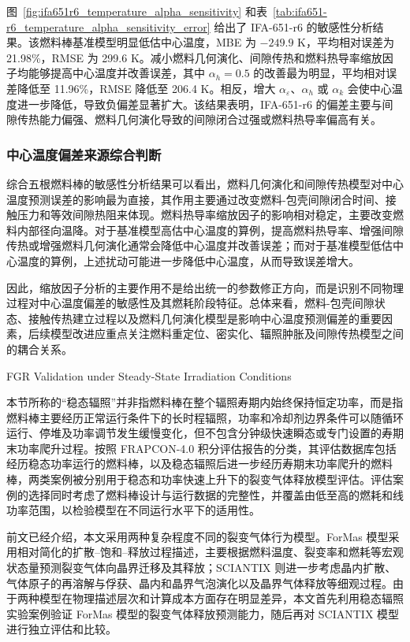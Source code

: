 图~\ref{fig:ifa651r6_temperature_alpha_sensitivity} 和表~\ref{tab:ifa651-r6_temperature_alpha_sensitivity_error} 给出了 IFA-651-r6 的敏感性分析结果。该燃料棒基准模型明显低估中心温度，MBE 为 \(-249.9\) K，平均相对误差为 21.98\%，RMSE 为 299.6 K。减小燃料几何演化、间隙传热和燃料热导率缩放因子均能够提高中心温度并改善误差，其中 \(\alpha_h=0.5\) 的改善最为明显，平均相对误差降低至 11.96\%，RMSE 降低至 206.4 K。相反，增大 \(\alpha_{\varepsilon}\)、\(\alpha_h\) 或 \(\alpha_k\) 会使中心温度进一步降低，导致负偏差显著扩大。该结果表明，IFA-651-r6 的偏差主要与间隙传热能力偏强、燃料几何演化导致的间隙闭合过强或燃料热导率偏高有关。

\subsubsection{中心温度偏差来源综合判断}

综合五根燃料棒的敏感性分析结果可以看出，燃料几何演化和间隙传热模型对中心温度预测误差的影响最为直接，其作用主要通过改变燃料-包壳间隙闭合时间、接触压力和等效间隙热阻来体现。燃料热导率缩放因子的影响相对稳定，主要改变燃料内部径向温降。对于基准模型高估中心温度的算例，提高燃料热导率、增强间隙传热或增强燃料几何演化通常会降低中心温度并改善误差；而对于基准模型低估中心温度的算例，上述扰动可能进一步降低中心温度，从而导致误差增大。

因此，缩放因子分析的主要作用不是给出统一的参数修正方向，而是识别不同物理过程对中心温度偏差的敏感性及其燃耗阶段特征。总体来看，燃料-包壳间隙状态、接触传热建立过程以及燃料几何演化模型是影响中心温度预测偏差的重要因素，后续模型改进应重点关注燃料重定位、密实化、辐照肿胀及间隙传热模型之间的耦合关系。


{FGR Validation under Steady-State Irradiation Conditions}

本节所称的“稳态辐照”并非指燃料棒在整个辐照寿期内始终保持恒定功率，而是指燃料棒主要经历正常运行条件下的长时程辐照，功率和冷却剂边界条件可以随循环运行、停堆及功率调节发生缓慢变化，但不包含分钟级快速瞬态或专门设置的寿期末功率爬升过程。按照 FRAPCON-4.0 积分评估报告的分类，其评估数据库包括经历稳态功率运行的燃料棒，以及稳态辐照后进一步经历寿期末功率爬升的燃料棒，两类案例被分别用于稳态和功率快速上升下的裂变气体释放模型评估。评估案例的选择同时考虑了燃料棒设计与运行数据的完整性，并覆盖由低至高的燃耗和线功率范围，以检验模型在不同运行水平下的适用性。

前文已经介绍，本文采用两种复杂程度不同的裂变气体行为模型。ForMas 模型采用相对简化的扩散--饱和--释放过程描述，主要根据燃料温度、裂变率和燃耗等宏观状态量预测裂变气体向晶界迁移及其释放；SCIANTIX 则进一步考虑晶内扩散、气体原子的再溶解与俘获、晶内和晶界气泡演化以及晶界气体释放等细观过程。由于两种模型在物理描述层次和计算成本方面存在明显差异，本文首先利用稳态辐照实验案例验证 ForMas 模型的裂变气体释放预测能力，随后再对 SCIANTIX 模型进行独立评估和比较。

